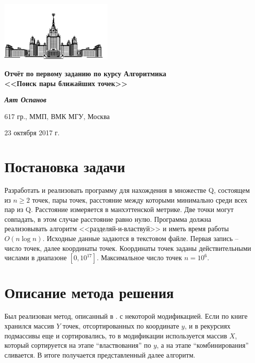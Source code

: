 \documentclass[12pt, a4paper]{article}
\begin{document}
    \begin{singlespace}
    \begin{center}
        \includegraphics[height=3cm]{msu.png}

        {\large\textbf{Отчёт по первому заданию по курсу Алгоритмика\\
        <<Поиск пары ближайших точек>>}}

        \vspace{0.3cm}

        \textit{\textbf{Аят Оспанов}}

        617 гр., ММП, ВМК МГУ, Москва

        23 октября 2017 г.
    \end{center}
    \end{singlespace}

    \tableofcontents

    \section{Постановка задачи}
        Разработать и реализовать программу для нахождения в множестве Q, состоящем из $n \geq 2$ точек, пары точек, расстояние между которыми минимально среди всех пар из Q. Расстояние измеряется в манхэттенской метрике. Две точки могут совпадать, в этом случае расстояние равно нулю. Программа должна реализовывать алгоритм <<разделяй-и-властвуй>> и иметь время работы $O(n\log n)$. Исходные данные задаются в текстовом файле. Первая запись -- число точек, далее координаты точек. Координаты точек заданы действительными числами в диапазоне $[0, 10^{17}]$. Максимальное число точек $n=10^6$.

    \section{Описание метода решения}
        Был реализован метод, описанный в \cite{clrs}. с некоторой модификацией. Если по книге хранился массив $Y$ точек, отсортированных по координате $y$, и в рекурсиях подмассивы еще и сортировались, то в модификации используется массив $X$, который сортируется на этапе ``властвования'' по $y$, а на этапе ``комбинирования'' сливается. В итоге получается представленный далее алгоритм.
\end{document}
